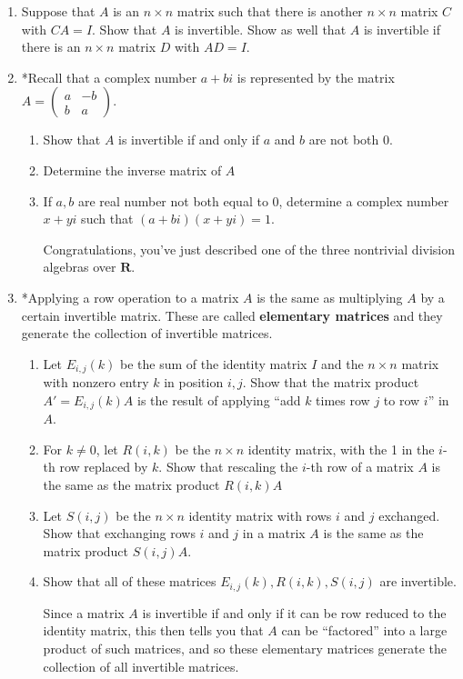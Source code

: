 \documentclass[12pt]{article}
\numberwithin{equation}{subsection}
\numberwithin{figure}{subsection}
\theoremstyle{note}
\begin{document}
\begin{enumerate}[label=\arabic*.]
\item Suppose that $A$ is an $n\times n$ matrix such that there is another $n\times n$ matrix $C$ with $CA=I$. Show that $A$ is invertible. Show as well that $A$ is invertible if there is an $n\times n$ matrix $D$ with $AD=I$. 

\item *Recall that a complex number $a+bi$ is represented by the matrix $A=\begin{pmatrix} a & -b \\ b & a\end{pmatrix}$. 
\begin{enumerate}
	\item Show that $A$ is invertible if and only if $a$ and $b$ are not both $0$. 
	\item Determine the inverse matrix of $A$
	\item If $a,b$ are real number not both equal to $0$, determine a complex number $x+yi$ such that $(a+bi)(x+yi)=1$. 
	
Congratulations, you've just described one of the three nontrivial division algebras over $\mathbf{R}$. 
	
\end{enumerate}
\item *Applying a row operation to a matrix $A$ is the same as multiplying $A$ by a certain invertible matrix. These are called \textbf{elementary matrices} and they generate the collection of invertible matrices. 

\begin{enumerate} 
	\item Let $E_{i,j}(k)$ be the sum of the identity matrix $I$ and the $n\times n$ matrix with nonzero entry $k$ in position $i,j$. Show that the matrix product $A'=E_{i,j}(k)A$ is the result of applying ``add $k$ times row $j$ to row $i$'' in $A$.
	\item For $k\neq 0$, let $R(i,k)$ be the $n\times n$ identity matrix, with the 1 in the $i$-th row replaced by $k$. Show that rescaling the $i$-th row of a matrix $A$ is the same as the matrix product $R(i,k)A$
	\item Let $S(i,j)$ be the $n\times n$ identity matrix with rows $i$ and $j$ exchanged. Show that exchanging rows $i$ and $j$ in a matrix $A$ is the same as the matrix product $S(i,j)A$. 
	\item Show that all of these matrices $E_{i,j}(k), R(i,k), S(i,j)$ are invertible. 
	
	Since a matrix $A$ is invertible if and only if it can be row reduced to the identity matrix, this then tells you that $A$ can be ``factored'' into a large product of such matrices, and so these elementary matrices generate the collection of all invertible matrices. 
\end{enumerate} 
\end{enumerate}
\end{document}
